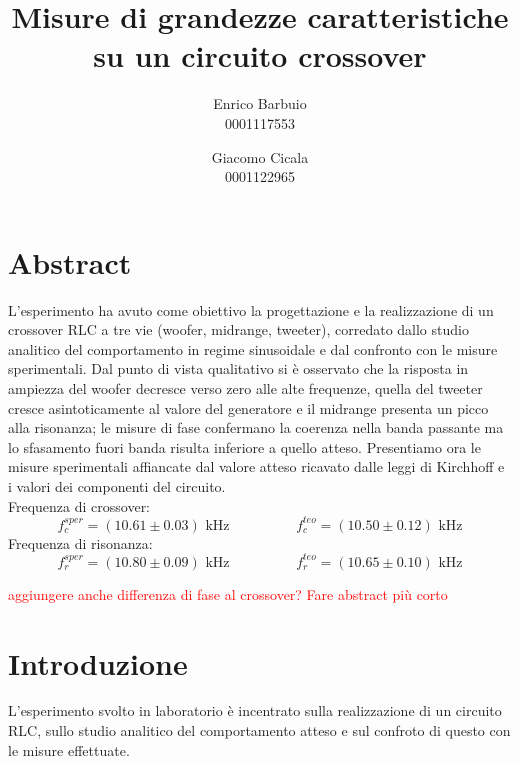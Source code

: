 \documentclass[12pt,italian]{article}
\title{Misure di grandezze caratteristiche su un circuito crossover}
\author{Enrico Barbuio \\ 0001117553 \and Giacomo Cicala \\ 0001122965}
\date{\err{data}}
\newcommand{\err}[1]{\textcolor{red}{#1}}
\begin{document}
\maketitle
\section*{Abstract}

L'esperimento ha avuto come obiettivo la progettazione e la realizzazione di un
crossover RLC a tre vie (woofer, midrange, tweeter), corredato dallo studio
analitico del comportamento in regime sinusoidale e dal confronto con le misure
sperimentali. Dal punto di vista qualitativo si è osservato che la risposta in
ampiezza del woofer decresce verso zero alle alte frequenze, quella del tweeter
cresce asintoticamente al valore del generatore e il midrange presenta un picco
alla risonanza; le misure di fase confermano la coerenza nella banda passante
ma lo sfasamento fuori banda risulta inferiore a quello atteso. Presentiamo ora
le misure sperimentali affiancate dal valore atteso ricavato dalle leggi di
Kirchhoff e i valori dei componenti del circuito.\\ Frequenza di crossover:
\begin{equation*} f_{c}^{sper} = (10.61 \pm 0.03) \text{ kHz} \hspace{2cm}
	f_{c}^{teo} = (10.50 \pm 0.12) \text{ kHz} \end{equation*} \noindent Frequenza
di risonanza: \begin{equation*} f_{r}^{sper} = (10.80 \pm 0.09) \text{ kHz}
	\hspace{2cm} f_{r}^{teo} = (10.65 \pm 0.10) \text{ kHz} \end{equation*}

\err{aggiungere anche differenza di fase al crossover? Fare abstract più corto}

\section*{Introduzione}

L'esperimento svolto in laboratorio è incentrato sulla realizzazione di un
circuito RLC, sullo studio analitico del comportamento atteso e sul confroto di
questo con le misure effettuate.
\end{document}
